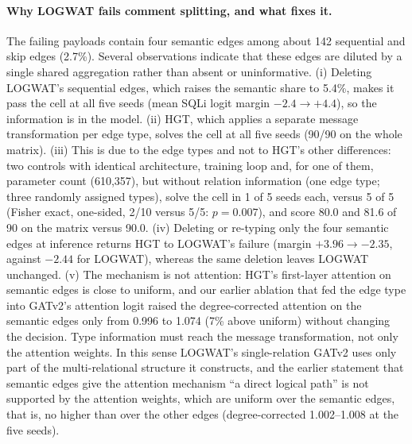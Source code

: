 \paragraph{Why LOGWAT fails comment splitting, and what fixes it.}
The failing payloads contain four semantic edges among about 142 sequential and skip edges (2.7\%). Several observations indicate that these edges are diluted by a single shared aggregation rather than absent or uninformative. (i) Deleting LOGWAT's sequential edges, which raises the semantic share to 5.4\%, makes it pass the cell at all five seeds (mean SQLi logit margin $-2.4 \rightarrow +4.4$), so the information is in the model. (ii) HGT, which applies a separate message transformation per edge type, solves the cell at all five seeds (90/90 on the whole matrix). (iii) This is due to the edge types and not to HGT's other differences: two controls with identical architecture, training loop and, for one of them, parameter count (610{,}357), but without relation information (one edge type; three randomly assigned types), solve the cell in 1 of 5 seeds each, versus 5 of 5 (Fisher exact, one-sided, 2/10 versus 5/5: $p=0.007$), and score 80.0 and 81.6 of 90 on the matrix versus 90.0. (iv) Deleting or re-typing only the four semantic edges at inference returns HGT to LOGWAT's failure (margin $+3.96 \rightarrow -2.35$, against $-2.44$ for LOGWAT), whereas the same deletion leaves LOGWAT unchanged. (v) The mechanism is not attention: HGT's first-layer attention on semantic edges is close to uniform, and our earlier ablation that fed the edge type into GATv2's attention logit raised the degree-corrected attention on the semantic edges only from 0.996 to 1.074 (7\% above uniform) without changing the decision. Type information must reach the message transformation, not only the attention weights. In this sense LOGWAT's single-relation GATv2 uses only part of the multi-relational structure it constructs, and the earlier statement that semantic edges give the attention mechanism ``a direct logical path'' is not supported by the attention weights, which are uniform over the semantic edges, that is, no higher than over the other edges (degree-corrected 1.002--1.008 at the five seeds).


